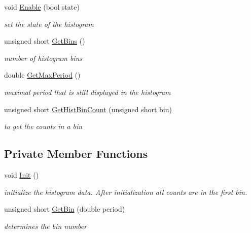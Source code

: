 \begin{DoxyCompactItemize}
void \hyperlink{classHistogramData_ab3908c587c2e03741d4ca05f84fbc82f}{Enable} (bool state)
\begin{DoxyCompactList}\small\item\em set the state of the histogram \end{DoxyCompactList}\item 
unsigned short \hyperlink{classHistogramData_a9ee374cc3bab303463c9a7788b7e7b6f}{Get\+Bins} ()
\begin{DoxyCompactList}\small\item\em number of histogram bins \end{DoxyCompactList}\item 
double \hyperlink{classHistogramData_a9f1db31342e0a70473c2ab61cc0e0f22}{Get\+Max\+Period} ()
\begin{DoxyCompactList}\small\item\em maximal period that is still displayed in the histogram \end{DoxyCompactList}\item 
unsigned short \hyperlink{classHistogramData_a49e967388837f909afb328f9e55da205}{Get\+Hist\+Bin\+Count} (unsigned short bin)
\begin{DoxyCompactList}\small\item\em to get the counts in a bin \end{DoxyCompactList}\end{DoxyCompactItemize}
\subsection*{Private Member Functions}
\begin{DoxyCompactItemize}
\item 
\mbox{\label{classHistogramData_af625e098e04198007b4d96de4ac624d1}} 
void \hyperlink{classHistogramData_af625e098e04198007b4d96de4ac624d1}{Init} ()
\begin{DoxyCompactList}\small\item\em initialize the histogram data. After initialization all counts are in the first bin. \end{DoxyCompactList}\item 
unsigned short \hyperlink{classHistogramData_af38a5e6485965296d7c02f8f57a92bb5}{Get\+Bin} (double period)
\begin{DoxyCompactList}\small\item\em determines the bin number \end{DoxyCompactList}\end{DoxyCompactItemize}
